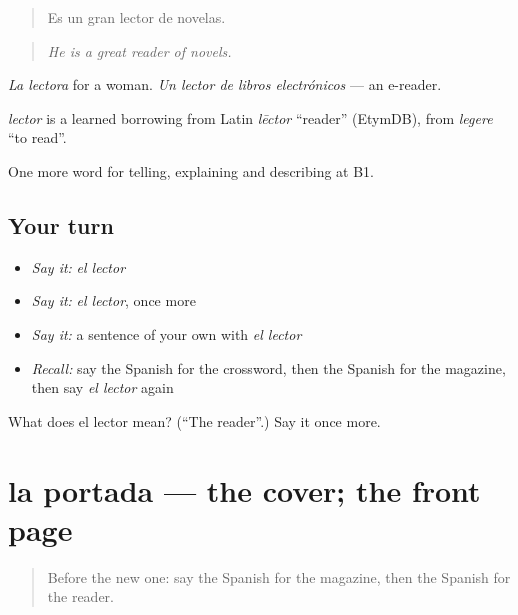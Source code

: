 \begin{quote}
Es un gran lector de novelas.
\end{quote}

\begin{quote}
\emph{He is a great reader of novels.}
\end{quote}

\emph{La lectora} for a woman. \emph{Un lector de libros electrónicos} — an e-reader.

\begin{cousinweb}
\emph{lector} is a learned borrowing from Latin \emph{lēctor} \textquotedblleft{}reader\textquotedblright{} (EtymDB), from \emph{legere} \textquotedblleft{}to read\textquotedblright{}.
\end{cousinweb}

\begin{grammarlens}[title={What you've built}]
One more word for telling, explaining and describing at B1.
\end{grammarlens}

\subsection*{Your turn}
\begin{itemize}
\raggedright
  \item \emph{Say it:} \emph{el lector}
  \item \emph{Say it:} \emph{el lector}, once more
  \item \emph{Say it:} a sentence of your own with \emph{el lector}
  \item \emph{Recall:} say the Spanish for the crossword, then the Spanish for the magazine, then say \emph{el lector} again
\end{itemize}

\begin{tcolorbox}[breakable,colback=teal!4,colframe=teal!35!black,title={Before you move on}]
What does el lector mean? (\textquotedblleft{}The reader\textquotedblright{}.) Say it once more.
\end{tcolorbox}
\section[la portada]{la portada — the cover; the front page}

\label{lesson:ES-C762-portada}



\begin{quote}
Before the new one: say the Spanish for the magazine, then the Spanish for the reader.
\end{quote}

